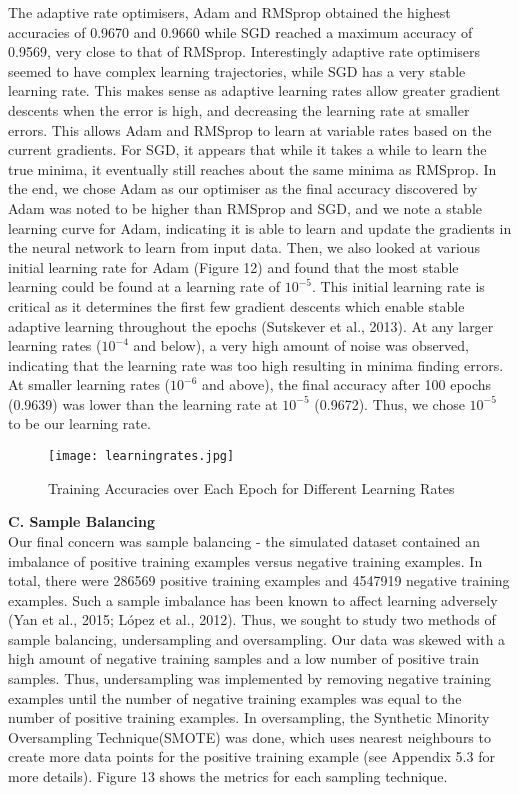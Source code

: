 \documentclass{article}
\begin{document}
The adaptive rate optimisers, Adam and RMSprop obtained the highest accuracies of 0.9670 and 0.9660 while SGD reached a maximum accuracy of 0.9569, very close to that of RMSprop. Interestingly adaptive rate optimisers seemed to have complex learning trajectories, while SGD has a very stable learning rate. This makes sense as adaptive learning rates allow greater gradient descents when the error is high, and decreasing the learning rate at smaller errors. This allows Adam and RMSprop to learn at variable rates based on the current gradients. For SGD, it appears that while it takes a while to learn the true minima, it eventually still reaches about the same minima as RMSprop. In the end, we chose Adam as our optimiser as the final accuracy discovered by Adam was noted to be higher than RMSprop and SGD, and we note a stable learning curve for Adam, indicating it is able to learn and update the gradients in the neural network to learn from input data. Then, we also looked at various initial learning rate for Adam (Figure 12) and found that the most stable learning could be found at a learning rate of $10^{-5}$. This initial learning rate is critical as it determines the first few gradient descents which enable stable adaptive learning throughout the epochs (Sutskever et al., 2013). At any larger learning rates ($10^{-4}$ and below), a very high amount of noise was observed, indicating that the learning rate was too high resulting in minima finding errors. At smaller learning rates ($10^{-6}$ and above), the final accuracy after 100 epochs (0.9639) was lower than the learning rate at $10^{-5}$ (0.9672). Thus, we chose $10^{-5}$ to be our learning rate.
\begin{figure}[H]
\texttt{[image: learningrates.jpg]}
\centering
\caption{Training Accuracies over Each Epoch for Different Learning Rates}
\end{figure}
\textbf{C. Sample Balancing}\\
Our final concern was sample balancing - the simulated dataset contained an imbalance of positive training examples versus negative training examples. In total, there were 286569 positive training examples and 4547919 negative training examples. Such a sample imbalance has been known to affect learning adversely (Yan et al., 2015; López et al., 2012). Thus, we sought to study two methods of sample balancing, undersampling and oversampling. Our data was skewed with a high amount of negative training samples and a low number of positive train samples. Thus, undersampling was implemented by removing negative training examples until the number of negative training examples was equal to the number of positive training examples. In oversampling, the Synthetic Minority Oversampling Technique(SMOTE) was done, which uses nearest neighbours to create more data points for the positive training example (see Appendix 5.3 for more details). Figure 13 shows the metrics for each sampling technique.
\end{document}
